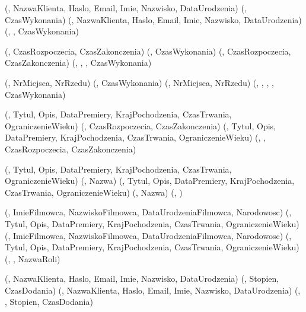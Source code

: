 
\zwiazek
\encje
    \encja[KLIENT](, NazwaKlienta, Haslo, Email, Imie, Nazwisko, DataUrodzenia)
    \encja[REZERWACJA](, CzasWykonania)
\relacje
    (, NazwaKlienta, Haslo, Email, Imie, Nazwisko, DataUrodzenia)
    (, , CzasWykonania)

\zwiazek
\encje
    \encja[SPEKTAKL](, CzasRozpoczecia, CzasZakonczenia)
    \encja[REZERWACJA](, CzasWykonania)
\relacje
    (, CzasRozpoczecia, CzasZakonczenia)
    (, , , CzasWykonania)

\zwiazek
\encje
    \encja[MIEJSCE](, NrMiejsca, NrRzedu)
    \encja[REZERWACJA](, CzasWykonania)
\relacje
    (, NrMiejsca, NrRzedu)
    (, , , , CzasWykonania)

\zwiazek
\encje
    \encja[FILM](, Tytul, Opis, DataPremiery, KrajPochodzenia, CzasTrwania, OgraniczenieWieku)
    \encja[SPEKTAKL](, CzasRozpoczecia, CzasZakonczenia)
\relacje
    (, Tytul, Opis, DataPremiery, KrajPochodzenia, CzasTrwania, OgraniczenieWieku)
    (, , CzasRozpoczecia, CzasZakonczenia)

\zwiazek
\encje
    \encja[FILM](, Tytul, Opis, DataPremiery, KrajPochodzenia, CzasTrwania, OgraniczenieWieku)
    \encja[GATUNEK](, Nazwa)
\relacje
    (, Tytul, Opis, DataPremiery, KrajPochodzenia, CzasTrwania, OgraniczenieWieku)
    (, Nazwa)
    (, )

\zwiazek
\encje
    \encja[FILMOWIEC](, ImieFilmowca, NazwiskoFilmowca, DataUrodzeniaFilmowca, Narodowosc)
    \encja[FILM](, Tytul, Opis, DataPremiery, KrajPochodzenia, CzasTrwania, OgraniczenieWieku)
\relacje
    (, ImieFilmowca, NazwiskoFilmowca, DataUrodzeniaFilmowca, Narodowosc)
    (, Tytul, Opis, DataPremiery, KrajPochodzenia, CzasTrwania, OgraniczenieWieku)
    (, , NazwaRoli)

\zwiazek
\encje
    \encja[KLIENT](, NazwaKlienta, Haslo, Email, Imie, Nazwisko, DataUrodzenia)
    \encja[OCENA](, Stopien, CzasDodania)
\relacje
    (, NazwaKlienta, Haslo, Email, Imie, Nazwisko, DataUrodzenia)
    (, , Stopien, CzasDodania)

